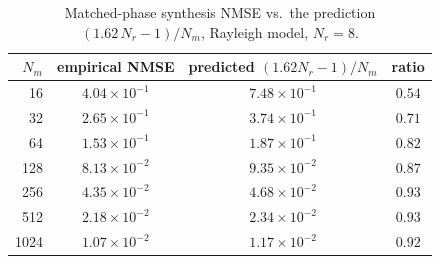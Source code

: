 \begin{table}[t]
  \centering
  \caption{Matched-phase synthesis NMSE vs.\ the prediction $(1.62\,N_r-1)/N_m$, Rayleigh model, $N_r=8$.}
  \label{tab:nm}
  \begin{tabular}{rccc}
    \toprule
    $N_m$ & empirical NMSE & predicted $(1.62N_r-1)/N_m$ & ratio \\
    \midrule
    16   & $4.04\times10^{-1}$ & $7.48\times10^{-1}$ & $0.54$ \\
    32   & $2.65\times10^{-1}$ & $3.74\times10^{-1}$ & $0.71$ \\
    64   & $1.53\times10^{-1}$ & $1.87\times10^{-1}$ & $0.82$ \\
    128  & $8.13\times10^{-2}$ & $9.35\times10^{-2}$ & $0.87$ \\
    256  & $4.35\times10^{-2}$ & $4.68\times10^{-2}$ & $0.93$ \\
    512  & $2.18\times10^{-2}$ & $2.34\times10^{-2}$ & $0.93$ \\
    1024 & $1.07\times10^{-2}$ & $1.17\times10^{-2}$ & $0.92$ \\
    \bottomrule
  \end{tabular}
\end{table}
